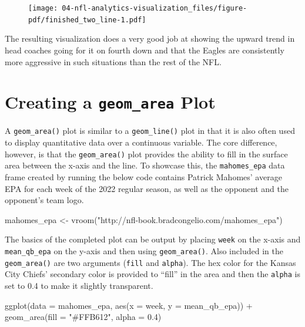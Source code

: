 \documentclass[
  letterpaper,
]{krantz}
\newenvironment{Shaded}{\begin{snugshade}}{\end{snugshade}}
\newcommand{\AttributeTok}[1]{\textcolor[rgb]{0.40,0.45,0.13}{#1}}
\newcommand{\FloatTok}[1]{\textcolor[rgb]{0.68,0.00,0.00}{#1}}
\newcommand{\FunctionTok}[1]{\textcolor[rgb]{0.28,0.35,0.67}{#1}}
\newcommand{\NormalTok}[1]{\textcolor[rgb]{0.00,0.23,0.31}{#1}}
\newcommand{\OtherTok}[1]{\textcolor[rgb]{0.00,0.23,0.31}{#1}}
\newcommand{\SpecialCharTok}[1]{\textcolor[rgb]{0.37,0.37,0.37}{#1}}
\newcommand{\StringTok}[1]{\textcolor[rgb]{0.13,0.47,0.30}{#1}}
\begin{document}
\begin{figure}[H]

{\centering \texttt{[image: 04-nfl-analytics-visualization\_files/figure-pdf/finished\_two\_line-1.pdf]}

}

\end{figure}

The resulting visualization does a very good job at showing the upward
trend in head coaches going for it on fourth down and that the Eagles
are consistently more aggressive in such situations than the rest of the
NFL.

\hypertarget{creating-a-geom_area-plot}{%
\section{\texorpdfstring{Creating a \texttt{geom\_area}
Plot}{Creating a geom\_area Plot}}\label{creating-a-geom_area-plot}}

A \texttt{geom\_area()} plot is similar to a \texttt{geom\_line()} plot
in that it is also often used to display quantitative data over a
continuous variable. The core difference, however, is that the
\texttt{geom\_area()} plot provides the ability to fill in the surface
area between the x-axis and the line. To showcase this, the
\texttt{mahomes\_epa} data frame created by running the below code
contains Patrick Mahomes' average EPA for each week of the 2022 regular
season, as well as the opponent and the opponent's team logo.

\begin{Shaded}
\begin{Highlighting}[]
\NormalTok{mahomes\_epa }\OtherTok{\textless{}{-}} \FunctionTok{vroom}\NormalTok{(}\StringTok{"http://nfl{-}book.bradcongelio.com/mahomes\_epa"}\NormalTok{)}
\end{Highlighting}
\end{Shaded}

The basics of the completed plot can be output by placing \texttt{week}
on the x-axis and \texttt{mean\_qb\_epa} on the y-axis and then using
\texttt{geom\_area()}. Also included in the \texttt{geom\_area()} are
two arguments (\texttt{fill} and \texttt{alpha}). The hex color for the
Kansas City Chiefs' secondary color is provided to ``fill'' in the area
and then the \texttt{alpha} is set to 0.4 to make it slightly
transparent.

\begin{Shaded}
\begin{Highlighting}[]
\FunctionTok{ggplot}\NormalTok{(}\AttributeTok{data =}\NormalTok{ mahomes\_epa, }\FunctionTok{aes}\NormalTok{(}\AttributeTok{x =}\NormalTok{ week, }\AttributeTok{y =}\NormalTok{ mean\_qb\_epa)) }\SpecialCharTok{+}
  \FunctionTok{geom\_area}\NormalTok{(}\AttributeTok{fill =} \StringTok{"\#FFB612"}\NormalTok{, }\AttributeTok{alpha =} \FloatTok{0.4}\NormalTok{)}
\end{Highlighting}
\end{Shaded}
\end{document}
